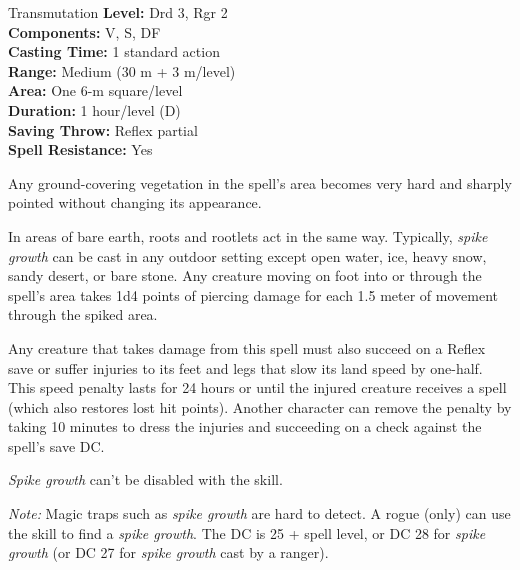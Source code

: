 {Transmutation}
{
	\textbf{Level:}
	Drd 3, Rgr 2\\
	\textbf{Components:}
	V, S, DF\\
	\textbf{Casting Time:}
	1 standard action\\
	\textbf{Range:}
	Medium (30 m + 3 m/level)\\
	\textbf{Area:}
	One 6-m square/level\\
	\textbf{Duration:}
	1 hour/level (D)\\
	\textbf{Saving Throw:}
	Reflex partial\\
	\textbf{Spell Resistance:}
	Yes\\
}
{
	Any ground-covering vegetation in the spell's area becomes very hard and sharply pointed without changing its appearance.

	In areas of bare earth, roots and rootlets act in the same way. Typically, \emph{spike growth} can be cast in any outdoor setting except open water, ice, heavy snow, sandy desert, or bare stone. Any creature moving on foot into or through the spell's area takes 1d4 points of piercing damage for each 1.5 meter of movement through the spiked area.

	Any creature that takes damage from this spell must also succeed on a Reflex save or suffer injuries to its feet and legs that slow its land speed by one-half. This speed penalty lasts for 24 hours or until the injured creature receives a  spell (which also restores lost hit points). Another character can remove the penalty by taking 10 minutes to dress the injuries and succeeding on a  check against the spell's save DC.

	\emph{Spike growth} can't be disabled with the  skill.

	\textit{Note:} Magic traps such as \emph{spike growth} are hard to detect. A rogue (only) can use the  skill to find a \emph{spike growth}. The DC is 25 + spell level, or DC 28 for \emph{spike growth} (or DC 27 for \emph{spike growth} cast by a ranger).

}
